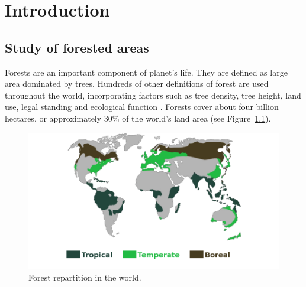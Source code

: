 
\chapter{Introduction} %
\label{Introduction} %


\startcontents[chapters]
\Mprintcontents





\section{Study of forested areas}
Forests are an important component of planet's life. They are defined as large area dominated by trees. Hundreds of other definitions of forest are used throughout the world, incorporating factors such as tree density, tree height, land use, legal standing and ecological function \citep{schuck2002compilation,achard2009vital}. Forests cover about four billion hectares, or approximately 30\% of the world's land area (see Figure~\ref{fig:forest_in_world}).

\begin{figure}[htbp]
\begin{center}
\includegraphics[width=\textwidth]{Figures/forest_in_world.png}
\caption{Forest repartition in the world.}
\label{fig:forest_in_world}
\end{center}
\end{figure}


